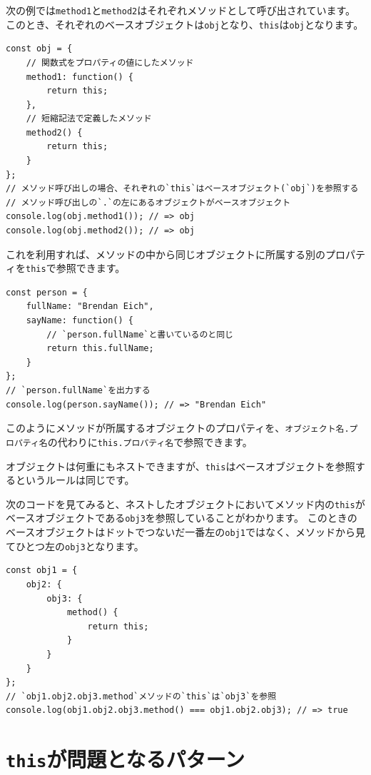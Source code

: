 次の例では\texttt{method1}と\texttt{method2}はそれぞれメソッドとして呼び出されています。
このとき、それぞれのベースオブジェクトは\texttt{obj}となり、\texttt{this}は\texttt{obj}となります。

\begin{lstlisting}
const obj = {
    // 関数式をプロパティの値にしたメソッド
    method1: function() {
        return this;
    },
    // 短縮記法で定義したメソッド
    method2() {
        return this;
    }
};
// メソッド呼び出しの場合、それぞれの`this`はベースオブジェクト(`obj`)を参照する
// メソッド呼び出しの`.`の左にあるオブジェクトがベースオブジェクト
console.log(obj.method1()); // => obj
console.log(obj.method2()); // => obj
\end{lstlisting}

これを利用すれば、メソッドの中から同じオブジェクトに所属する別のプロパティを\texttt{this}で参照できます。

\begin{lstlisting}
const person = {
    fullName: "Brendan Eich",
    sayName: function() {
        // `person.fullName`と書いているのと同じ
        return this.fullName;
    }
};
// `person.fullName`を出力する
console.log(person.sayName()); // => "Brendan Eich"
\end{lstlisting}

このようにメソッドが所属するオブジェクトのプロパティを、\texttt{オブジェクト名.プロパティ名}の代わりに\texttt{this.プロパティ名}で参照できます。

オブジェクトは何重にもネストできますが、\texttt{this}はベースオブジェクトを参照するというルールは同じです。

次のコードを見てみると、ネストしたオブジェクトにおいてメソッド内の\texttt{this}がベースオブジェクトである\texttt{obj3}を参照していることがわかります。
このときのベースオブジェクトはドットでつないだ一番左の\texttt{obj1}ではなく、メソッドから見てひとつ左の\texttt{obj3}となります。

\begin{lstlisting}
const obj1 = {
    obj2: {
        obj3: {
            method() {
                return this;
            }
        }
    }
};
// `obj1.obj2.obj3.method`メソッドの`this`は`obj3`を参照
console.log(obj1.obj2.obj3.method() === obj1.obj2.obj3); // => true
\end{lstlisting}

\hypertarget{this-problem}{%
\section{\texorpdfstring{\texttt{this}が問題となるパターン}{thisが問題となるパターン}}\label{this-problem}}

